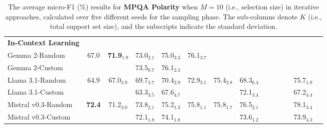 \documentclass[11pt]{article}
\theoremstyle{definition}
\begin{document}
\begin{table*}[hbt]
{\begin{tabular}{l|ccccccccccccc}
\hdashline

\textbf{In-Context Learning} \\

Gemma 2-Random &
67.0 & \textbf{71.9}$_{1.9}$ & 73.0$_{2.1}$ & 75.0$_{3.3}$ & 76.1$_{3.7}$ & & & \\

Gemma 2-Custom &
& & 73.5$_{0.7}$ & 76.1$_{2.3}$ & & & & \\

\hdashline[1pt/4pt]

Llama 3.1-Random &
64.9 & 67.0$_{3.9}$ & 69.7$_{3.7}$ & 70.4$_{2.9}$ & 72.9$_{3.1}$ & 75.4$_{2.8}$ & 68.3$_{6.4}$ & & & & & 75.7$_{1.9}$ \\

Llama 3.1-Custom &
& & 63.3$_{3.5}$ & 67.6$_{4.7}$ & & & 72.1$_{3.4}$ & & & & & 67.2$_{4.4}$ & \\

\hdashline[1pt/4pt]

Mistral v0.3-Random &
\textbf{72.4} & 71.2$_{3.0}$ & 73.8$_{2.1}$ & 75.2$_{1.3}$ & 75.8$_{1.1}$ & 75.8$_{1.7}$ & 76.5$_{2.1}$ & & & & & 78.1$_{3.4}$ \\

Mistral v0.3-Custom &
& & 72.1$_{1.8}$ & 74.1$_{1.8}$ & & & 73.6$_{1.2}$ & & & & & 73.9$_{4.3}$ & \\

\hline

\end{tabular}
}
\caption{The average micro-F1 (\%) results for {\bf MPQA Polarity} when $M=10$ (i.e., selection size) in iterative approaches, calculated over five different seeds for the sampling phase. The sub-columns denote $K$ (i.e., total support set size), and the subscripts indicate the standard deviation.}
\label{table:p-complete}
\end{table*}
\end{document}

